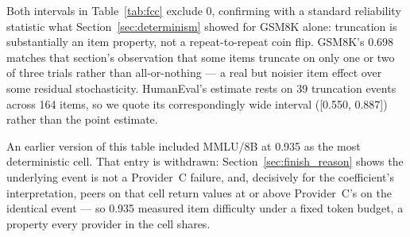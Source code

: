 \documentclass[11pt]{article}
\begin{document}
Both intervals in Table~\ref{tab:fcc} exclude 0, confirming with a
standard reliability statistic what Section~\ref{sec:determinism}
showed for GSM8K alone: truncation is substantially an item property,
not a repeat-to-repeat coin flip. GSM8K's 0.698 matches that section's
observation that some items truncate on only one or two of three
trials rather than all-or-nothing --- a real but noisier item effect
over some residual stochasticity. HumanEval's estimate rests on 39
truncation events across 164 items, so we quote its correspondingly
wide interval ([0.550, 0.887]) rather than the point estimate.

An earlier version of this table included MMLU/8B at 0.935 as the most
deterministic cell. That entry is withdrawn:
Section~\ref{sec:finish_reason} shows the underlying event is not a
Provider~C failure, and, decisively for the coefficient's
interpretation, peers on that cell return values at or above
Provider~C's on the identical event --- so 0.935 measured item
difficulty under a fixed token budget, a property every provider in
the cell shares.
\end{document}
